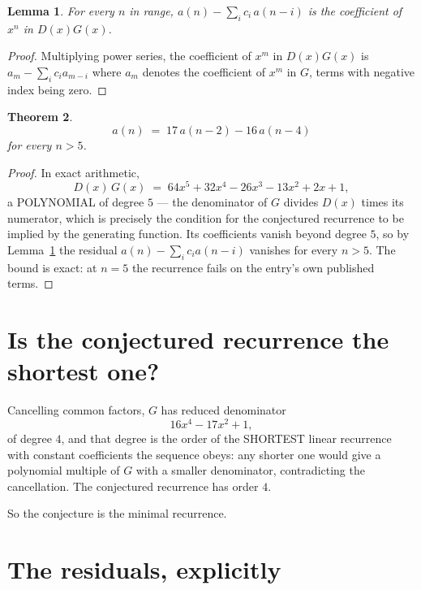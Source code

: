 \documentclass[11pt,a4paper]{article}
\theoremstyle{plain}
\newtheorem{theorem}{Theorem}
\newtheorem{lemma}[theorem]{Lemma}
\theoremstyle{definition}
\begin{document}
\begin{lemma}\label{lem:key}
For every $n$ in range, $a(n)-\sum_i c_i\,a(n-i)$ is the coefficient of $x^{n}$ in
$D(x)G(x)$.
\end{lemma}

\begin{proof}
Multiplying power series, the coefficient of $x^{m}$ in $D(x)G(x)$ is
$a_m-\sum_i c_i a_{m-i}$ where $a_m$ denotes the coefficient of $x^{m}$ in $G$, terms with
negative index being zero.
\end{proof}

\begin{theorem}
\[
a(n)\;=\;17\,a(n-2) - 16\,a(n-4)
\]
for every $n>5$.
\end{theorem}

\begin{proof}
In exact arithmetic,
\[
D(x)\,G(x)\;=\;64 x^{5} + 32 x^{4} - 26 x^{3} - 13 x^{2} + 2 x + 1,
\]
a POLYNOMIAL of degree $5$ --- the denominator of $G$ divides $D(x)$ times its numerator,
which is precisely the condition for the conjectured recurrence to be implied by the
generating function. Its coefficients vanish beyond degree $5$, so by
Lemma~\ref{lem:key} the residual $a(n)-\sum_ic_ia(n-i)$ vanishes for every
$n>5$. The bound is exact: at $n=5$ the recurrence fails on the entry's own published terms.
\end{proof}

\section{Is the conjectured recurrence the shortest one?}

Cancelling common factors, $G$ has reduced denominator
\[
16 x^{4} - 17 x^{2} + 1,
\]
of degree $4$, and that degree is the order of the SHORTEST linear recurrence with
constant coefficients the sequence obeys: any shorter one would give a polynomial multiple of
$G$ with a smaller denominator, contradicting the cancellation. The conjectured recurrence has
order $4$.

So the conjecture is the minimal recurrence.

\section{The residuals, explicitly}
\end{document}
